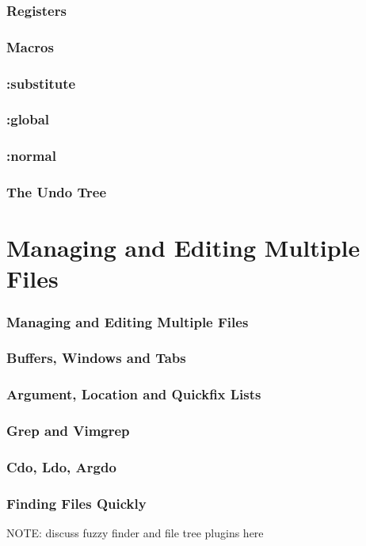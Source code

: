 \documentclass{beamer}
\begin{document}
\begin{frame}[fragile]
    \frametitle{Registers}
\end{frame}

\begin{frame}[fragile]
    \frametitle{Macros}
\end{frame}

\begin{frame}[fragile]
    \frametitle{:substitute}
\end{frame}

\begin{frame}[fragile]
    \frametitle{:global}
\end{frame}

\begin{frame}[fragile]
    \frametitle{:normal}
\end{frame}

\begin{frame}[fragile]
    \frametitle{The Undo Tree}
\end{frame}

\section{Managing and Editing Multiple Files}

\begin{frame}[fragile]
    \frametitle{Managing and Editing Multiple Files}
    \tableofcontents[currentsection]
\end{frame}

\begin{frame}[fragile]
    \frametitle{Buffers, Windows and Tabs}
\end{frame}

\begin{frame}[fragile]
    \frametitle{Argument, Location and Quickfix Lists}
\end{frame}

\begin{frame}[fragile]
    \frametitle{Grep and Vimgrep}
\end{frame}

\begin{frame}[fragile]
    \frametitle{Cdo, Ldo, Argdo}
\end{frame}

\begin{frame}[fragile]
    \frametitle{Finding Files Quickly}
    NOTE: discuss fuzzy finder and file tree plugins here
\end{frame}
\end{document}
